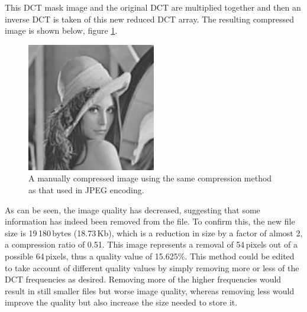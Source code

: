 		This DCT mask image and the original DCT are multiplied together and then an inverse DCT is taken of this new reduced DCT array. The resulting compressed image is shown below, figure \ref{fig:mancompresslena}.
		\begin{figure}[ht]
			\centering
			\includegraphics[width=0.5\textwidth]{lena_manual_compression.jpg}
			\caption{A manually compressed image using the same compression method as that used in JPEG encoding.\label{fig:mancompresslena}}
		\end{figure}

		As can be seen, the image quality has decreased, suggesting that some information has indeed been removed from the file. To confirm this, the new file size is 19\,180\,bytes (18.73\,Kb), which is a reduction in size by a factor of almost 2, a compression ratio of 0.51. This image represents a removal of 54\,pixels out of a possible 64\,pixels, thus a quality value of 15.625\%. This method could be edited to take account of different quality values by simply removing more or less of the DCT frequencies as desired. Removing more of the higher frequencies would result in still smaller files but worse image quality, whereas removing less would improve the quality but also increase the size needed to store it.

